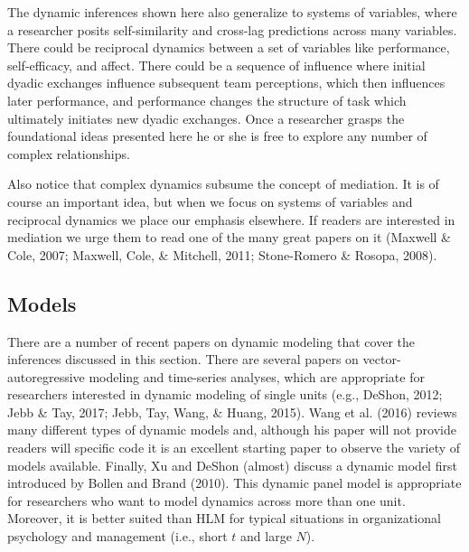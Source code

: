 \documentclass[english,,man]{apa6}
\theoremstyle{definition}
\theoremstyle{definition}
\theoremstyle{definition}
\theoremstyle{remark}
\begin{document}
The dynamic inferences shown here also generalize to systems of
variables, where a researcher posits self-similarity and cross-lag
predictions across many variables. There could be reciprocal dynamics
between a set of variables like performance, self-efficacy, and affect.
There could be a sequence of influence where initial dyadic exchanges
influence subsequent team perceptions, which then influences later
performance, and performance changes the structure of task which
ultimately initiates new dyadic exchanges. Once a researcher grasps the
foundational ideas presented here he or she is free to explore any
number of complex relationships.

Also notice that complex dynamics subsume the concept of mediation. It
is of course an important idea, but when we focus on systems of
variables and reciprocal dynamics we place our emphasis elsewhere. If
readers are interested in mediation we urge them to read one of the many
great papers on it (Maxwell \& Cole, 2007; Maxwell, Cole, \& Mitchell,
2011; Stone-Romero \& Rosopa, 2008).

\hypertarget{models-3}{%
\subsection{Models}\label{models-3}}

There are a number of recent papers on dynamic modeling that cover the
inferences discussed in this section. There are several papers on
vector-autoregressive modeling and time-series analyses, which are
appropriate for researchers interested in dynamic modeling of single
units (e.g., DeShon, 2012; Jebb \& Tay, 2017; Jebb, Tay, Wang, \& Huang,
2015). Wang et al. (2016) reviews many different types of dynamic models
and, although his paper will not provide readers will specific code it
is an excellent starting paper to observe the variety of models
available. Finally, Xu and DeShon (almost) discuss a dynamic model first
introduced by Bollen and Brand (2010). This dynamic panel model is
appropriate for researchers who want to model dynamics across more than
one unit. Moreover, it is better suited than HLM for typical situations
in organizational psychology and management (i.e., short \(t\) and large
\(N\)).
\end{document}
